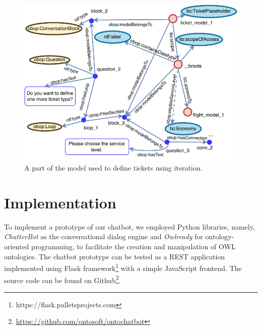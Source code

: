 \documentclass[runningheads]{llncs}
\begin{document}
\begin{figure}[H]
  \centering
  \includegraphics[width=\linewidth]{img/iteration_example}
  \caption{A part of the model used to define tickets using iteration.}
  \label{fig:iteration_example}
\end{figure}


\FloatBarrier 
\section {Implementation}
To implement a prototype of our chatbot, we employed Python libraries, namely, \textit{ChatterBot} as the conversational dialog engine and \textit{Owlready} \cite{lamy2017owlready} for ontology-oriented programming, to facilitate the creation and manipulation of OWL ontologies. The chatbot prototype can be tested as a REST application implemented using Flask framework\footnote{\label{flaskfootnote}https://flask.palletsprojects.com} with a simple JavaScript frontend. The source code can be found on Github\footnote{\url{https://github.com/ontosoft/ontochatbot}}. 
\end{document}
